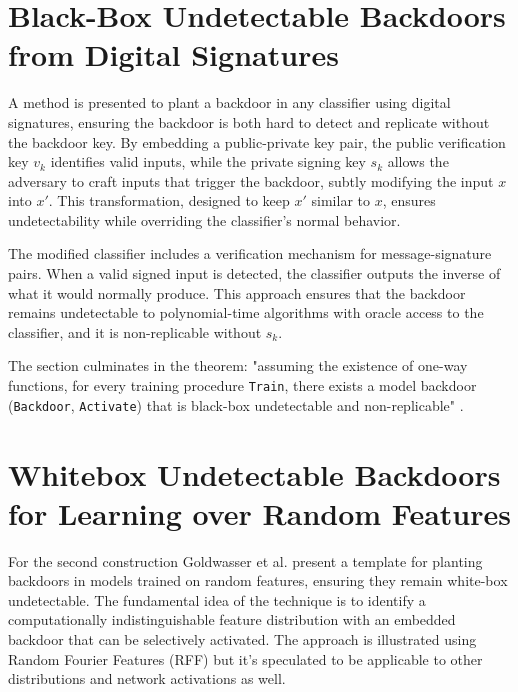 \documentclass[
	fontsize=12pt,
	headings=small,
	parskip=quarter,
	bibliography=totoc,
	numbers=noenddot,       
	open=any,               
 	final                   
]{scrreprt}
\begin{document}
\section{Black-Box Undetectable Backdoors from Digital Signatures}

A method is presented to plant a backdoor in any classifier using digital signatures, ensuring the backdoor is both hard to detect and replicate without the backdoor key. By embedding a public-private key pair, the public verification key $v_k$ identifies valid inputs, while the private signing key $s_k$ allows the adversary to craft inputs that trigger the backdoor, subtly modifying the input $x$ into $x'$. This transformation, designed to keep $x'$ similar to $x$, ensures undetectability while overriding the classifier’s normal behavior.
\par The modified classifier includes a verification mechanism for message-signature pairs. When a valid signed input is detected, the classifier outputs the inverse of what it would normally produce. This approach ensures that the backdoor remains undetectable to polynomial-time algorithms with oracle access to the classifier, and it is non-replicable without $s_k$.
\par The section culminates in the theorem: "assuming the existence of one-way functions, for every training procedure \texttt{Train}, there exists a model backdoor (\texttt{Backdoor}, \texttt{Activate}) that is black-box undetectable and non-replicable" \cite{goldwasser2022backdoors}.


\section{Whitebox Undetectable Backdoors for Learning over Random Features}
For the second construction Goldwasser et al. present a template for planting backdoors in models trained on random features, ensuring they remain white-box undetectable. The fundamental idea of the technique is to identify a computationally indistinguishable feature distribution with an embedded backdoor that can be selectively activated. The approach is illustrated using Random Fourier Features (RFF) but it's speculated to be applicable to other distributions and network activations as well.
\end{document}
